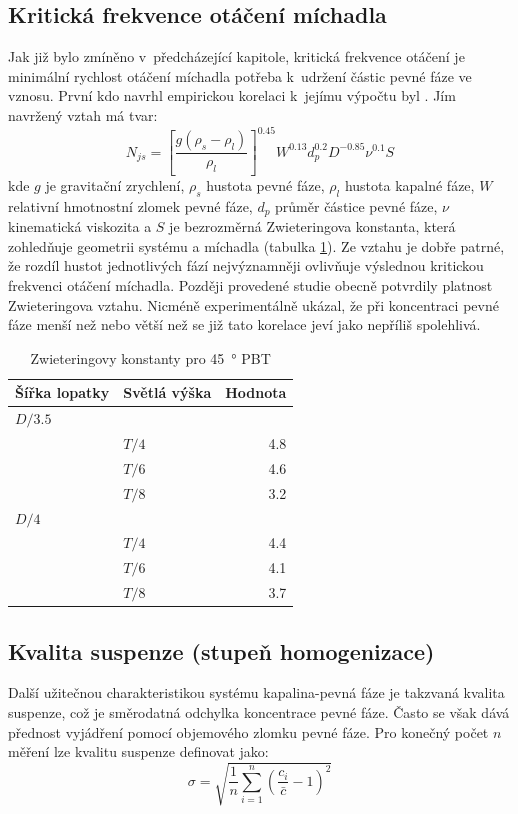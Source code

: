 \subsection{Kritická frekvence otáčení míchadla}
Jak již bylo zmíněno v~předcházející kapitole, kritická frekvence otáčení je minimální rychlost otáčení míchadla potřeba k~udržení částic pevné fáze ve vznosu. První kdo navrhl empirickou korelaci k~jejímu výpočtu byl \citet{zwi58}. Jím navržený vztah má tvar:
\begin{equation}
	N_{js} = \left[\frac{g(\rho_{s}-\rho_{l})}{\rho_{l}}\right]^{\num{0.45}}W^{\num{0.13}}d_{p}^{\num{0.2}}D^{\num{-0.85}}\nu^{\num{0.1}}S
	\label{eq:nkrit}
\end{equation} 
kde $g$ je gravitační zrychlení, $\rho_{s}$ hustota pevné fáze, $\rho_{l}$ hustota kapalné fáze, $W$ relativní hmotnostní zlomek pevné fáze, $d_{p}$ průměr částice pevné fáze, $\nu$ kinematická viskozita a $S$ je bezrozměrná Zwieteringova konstanta, která zohledňuje geometrii systému a míchadla (tabulka \ref{tab:S}). Ze vztahu je dobře patrné, že rozdíl hustot jednotlivých fází nejvýznamněji ovlivňuje výslednou kritickou frekvenci otáčení míchadla. Později provedené studie \citep{nie68,bal78,chou97} obecně potvrdily platnost Zwieteringova vztahu. Nicméně \citet{chou97} experimentálně ukázal, že při koncentraci pevné fáze menší než  nebo větší než  se již tato korelace jeví jako nepříliš spolehlivá.

\begin{table}[h!]
\centering
\caption{Zwieteringovy konstanty pro \SI{45}{\degree} PBT}
\label{tab:S}
\begin{tabular}{llr}
\toprule
\textbf{Šířka lopatky} & \textbf{Světlá výška} & \textbf{Hodnota} \\
\midrule

$D/\num{3.5}$ \\
& $T/4$ & \num{4.8} \\
& $T/6$ & \num{4.6} \\
& $T/8$ & \num{3.2} \\
$D/4$ \\
& $T/4$ & \num{4.4} \\
& $T/6$ & \num{4.1} \\
& $T/8$ & \num{3.7} \\

\bottomrule
\end{tabular}
\end{table}

\subsection{Kvalita suspenze (stupeň homogenizace)}
Další užitečnou charakteristikou systému kapalina-pevná fáze je takzvaná kvalita suspenze, což je směrodatná odchylka koncentrace pevné fáze. Často se však dává přednost vyjádření pomocí objemového zlomku pevné fáze. Pro konečný počet $n$ měření lze kvalitu suspenze definovat jako:
\begin{equation}
	\sigma = \sqrt{\frac{1}{n}\sum_{i=1}^{n}\left(\frac{c_{i}}{\bar{c}} - 1\right)^{2}}
	\label{eq:kvasus}
\end{equation}  


